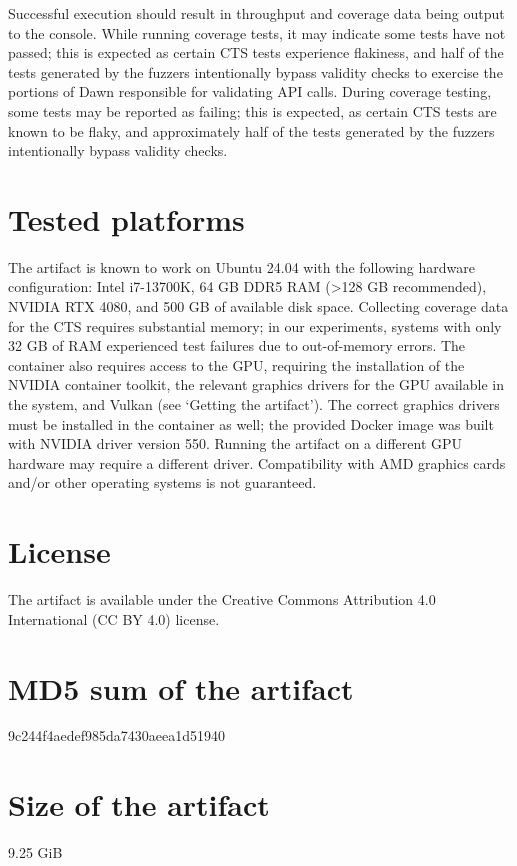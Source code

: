 \documentclass[a4paper,UKenglish]{darts-v2021}
\newenvironment{platforms}{\section{Tested platforms}}{}
\newcommand{\license}[1]{{\section{License}#1}}
\newcommand{\mdsum}[1]{{\section{MD5 sum of the artifact}#1}}
\newcommand{\artifactsize}[1]{{\section{Size of the artifact}#1}}
\begin{document}
Successful execution should result in throughput and coverage data being output to the console. While running coverage tests, it may indicate some tests have not passed; this is expected as certain CTS tests experience flakiness, and half of the tests generated by the fuzzers intentionally bypass validity checks to exercise the portions of Dawn responsible for validating API calls.
During coverage testing, some tests may be reported as failing; this is expected, as certain CTS tests are known to be flaky, and approximately half of the tests generated by the fuzzers intentionally bypass validity checks.
\begin{platforms}
The artifact is known to work on Ubuntu 24.04 with the following hardware configuration: Intel i7-13700K, 64 GB DDR5 RAM (>128 GB recommended), NVIDIA RTX 4080, and 500 GB of available disk space. 
Collecting coverage data for the CTS requires substantial memory; in our experiments, systems with only 32 GB of RAM experienced test failures due to out-of-memory errors.
The container also requires access to the GPU, requiring the installation of the NVIDIA container toolkit, the relevant graphics drivers for the GPU available in the system, and Vulkan (see `Getting the artifact').
The correct graphics drivers must be installed in the container as well; the provided Docker image was built with NVIDIA driver version 550. Running the artifact on a different GPU hardware may require a different driver.
Compatibility with AMD graphics cards and/or other operating systems is not guaranteed. 
\end{platforms}

\license{The artifact is available under the Creative Commons Attribution 4.0 International (CC BY 4.0) license.}

\mdsum{9c244f4aedef985da7430aeea1d51940}

\artifactsize{9.25 GiB}
\end{document}
